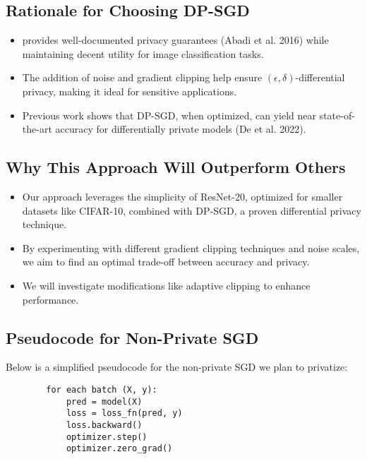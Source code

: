 \documentclass{article}
\begin{document}
    \subsection{Rationale for Choosing DP-SGD}\label{subsec:rationale-for-choosing-dp-sgd}
    \begin{itemize}
        \item provides well-documented privacy guarantees (Abadi et al. 2016)
            while maintaining decent utility for image classification tasks.
        \item The addition of noise and gradient clipping help ensure $(\epsilon, \delta)$-differential privacy,
            making it ideal for sensitive applications.
        \item Previous work shows that DP-SGD, when optimized, can yield near state-of-the-art accuracy
            for differentially private models (De et al. 2022).
    \end{itemize}

    \subsection{Why This Approach Will Outperform Others}\label{subsec:why-this-approach-will-outperform-others}
    \begin{itemize}
        \item Our approach leverages the simplicity of ResNet-20, optimized for smaller datasets like CIFAR-10,
            combined with DP-SGD, a proven differential privacy technique.
        \item By experimenting with different gradient clipping techniques and noise scales,
            we aim to find an optimal trade-off between accuracy and privacy.
        \item We will investigate modifications like adaptive clipping to enhance performance.
    \end{itemize}

    \subsection{Pseudocode for Non-Private SGD}\label{subsec:pseudo-code-for-non-private-sgd}
    Below is a simplified pseudocode for the non-private SGD we plan to privatize:
    \begin{verbatim}
        for each batch (X, y):
            pred = model(X)
            loss = loss_fn(pred, y)
            loss.backward()
            optimizer.step()
            optimizer.zero_grad()
    \end{verbatim}
\end{document}

